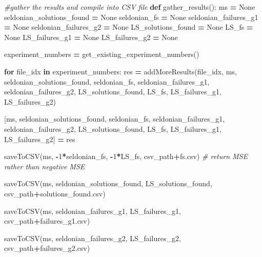 \documentclass[12pt, twoside]{amherstthesis}
\newenvironment{Shaded}{\begin{snugshade}}{\end{snugshade}}
\newcommand{\CommentTok}[1]{\textcolor[rgb]{0.56,0.35,0.01}{\textit{#1}}}
\newcommand{\ControlFlowTok}[1]{\textcolor[rgb]{0.13,0.29,0.53}{\textbf{#1}}}
\newcommand{\DecValTok}[1]{\textcolor[rgb]{0.00,0.00,0.81}{#1}}
\newcommand{\KeywordTok}[1]{\textcolor[rgb]{0.13,0.29,0.53}{\textbf{#1}}}
\newcommand{\NormalTok}[1]{#1}
\newcommand{\OperatorTok}[1]{\textcolor[rgb]{0.81,0.36,0.00}{\textbf{#1}}}
\newcommand{\StringTok}[1]{\textcolor[rgb]{0.31,0.60,0.02}{#1}}
\newcommand{\VariableTok}[1]{\textcolor[rgb]{0.00,0.00,0.00}{#1}}
\begin{document}
\begin{Shaded}
\begin{Highlighting}[]
\CommentTok{\#gather the results and compile into CSV file}
\KeywordTok{def}\NormalTok{ gather\_results():}
\NormalTok{    ms                        }\OperatorTok{=} \VariableTok{None}
\NormalTok{    seldonian\_solutions\_found }\OperatorTok{=} \VariableTok{None}
\NormalTok{    seldonian\_fs              }\OperatorTok{=} \VariableTok{None}
\NormalTok{    seldonian\_failures\_g1     }\OperatorTok{=} \VariableTok{None}
\NormalTok{    seldonian\_failures\_g2     }\OperatorTok{=} \VariableTok{None}
\NormalTok{    LS\_solutions\_found        }\OperatorTok{=} \VariableTok{None}
\NormalTok{    LS\_fs                     }\OperatorTok{=} \VariableTok{None}
\NormalTok{    LS\_failures\_g1            }\OperatorTok{=} \VariableTok{None}
\NormalTok{    LS\_failures\_g2            }\OperatorTok{=} \VariableTok{None}

\NormalTok{    experiment\_numbers }\OperatorTok{=}\NormalTok{ get\_existing\_experiment\_numbers()}

    \ControlFlowTok{for}\NormalTok{ file\_idx }\KeywordTok{in}\NormalTok{ experiment\_numbers:}
\NormalTok{        res }\OperatorTok{=}\NormalTok{ addMoreResults(file\_idx, }
\NormalTok{            ms, }
\NormalTok{            seldonian\_solutions\_found, }
\NormalTok{            seldonian\_fs, seldonian\_failures\_g1, seldonian\_failures\_g2, }
\NormalTok{            LS\_solutions\_found, LS\_fs, LS\_failures\_g1, LS\_failures\_g2)}
        
\NormalTok{        [ms, }
\NormalTok{        seldonian\_solutions\_found, seldonian\_fs, seldonian\_failures\_g1,}
\NormalTok{        seldonian\_failures\_g2, LS\_solutions\_found, LS\_fs, LS\_failures\_g1, }
\NormalTok{        LS\_failures\_g2] }\OperatorTok{=}\NormalTok{ res}

\NormalTok{    saveToCSV(ms,  }
    \OperatorTok{{-}}\DecValTok{1}\OperatorTok{*}\NormalTok{seldonian\_fs,           }
    \OperatorTok{{-}}\DecValTok{1}\OperatorTok{*}\NormalTok{LS\_fs,           }
\NormalTok{    csv\_path}\OperatorTok{+}\StringTok{\textquotesingle{}fs.csv\textquotesingle{}}\NormalTok{) }\CommentTok{\# return MSE rather than negative MSE}
    
\NormalTok{    saveToCSV(ms,  }
\NormalTok{    seldonian\_solutions\_found,  }
\NormalTok{    LS\_solutions\_found, }
\NormalTok{    csv\_path}\OperatorTok{+}\StringTok{\textquotesingle{}solutions\_found.csv\textquotesingle{}}\NormalTok{)}
    
\NormalTok{    saveToCSV(ms,  }
\NormalTok{    seldonian\_failures\_g1,      }
\NormalTok{    LS\_failures\_g1,     }
\NormalTok{    csv\_path}\OperatorTok{+}\StringTok{\textquotesingle{}failures\_g1.csv\textquotesingle{}}\NormalTok{)}
    
\NormalTok{    saveToCSV(ms,  }
\NormalTok{    seldonian\_failures\_g2,      }
\NormalTok{    LS\_failures\_g2,     }
\NormalTok{    csv\_path}\OperatorTok{+}\StringTok{\textquotesingle{}failures\_g2.csv\textquotesingle{}}\NormalTok{)}
\end{Highlighting}
\end{Shaded}
\end{document}
